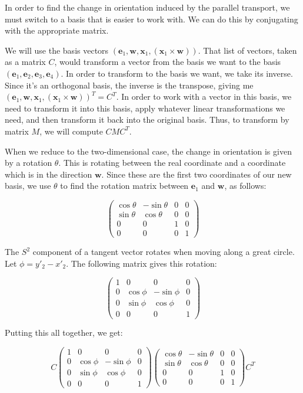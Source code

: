 In order to find the change in orientation induced by the parallel transport, we must switch to a basis that is easier to work with. We can do this by conjugating with the appropriate matrix.

We will use the basis vectors $(\textbf{e}_1, \textbf{w}, \textbf{x}_1, (\textbf{x}_1 \times \textbf{w}))$. That list of vectors, taken as a matrix $C$, would transform a vector from the basis we want to the basis $(\textbf{e}_1,\textbf{e}_2,\textbf{e}_3,\textbf{e}_4)$. In order to transform to the basis we want, we take its inverse. Since it's an orthogonal basis, the inverse is the transpose, giving me $(\textbf{e}_1, \textbf{w},\textbf{x}_1,(\textbf{x}_1 \times \textbf{w}))^T = C^T$. In order to work with a vector in this basis, we need to transform it into this basis, apply whatever linear transformations we need, and then transform it back into the original basis. Thus, to transform by matrix $M$, we will compute $CMC^T$.

When we reduce to the two-dimensional case, the change in orientation is given by a rotation $\theta$. This is rotating between the real coordinate and a coordinate which is in the direction $\textbf{w}$. Since these are the first two coordinates of our new basis, we use $\theta$ to find the rotation matrix between $\textbf{e}_1$ and $\textbf{w}$, as follows:


$$\left(\begin{array}{cccc} \cos\theta & -\sin\theta & 0 & 0 \\ \sin\theta & \cos\theta & 0 & 0 \\ 0 & 0 & 1 & 0 \\ 0 & 0 & 0 & 1 \end{array} \right)$$

The $S^2$ component of a tangent vector rotates when moving along a great circle. Let $\phi = y'_2-x'_2$. The following matrix gives this rotation:

$$\left(\begin{array}{cccc} 1 & 0 & 0 & 0 \\ 0 & \cos\phi & -\sin\phi & 0 \\ 0 & \sin\phi & \cos\phi & 0 \\ 0 & 0 & 0 & 1 \end{array} \right)$$

Putting this all together, we get:

$$C
\left(\begin{array}{cccc} 1 & 0 & 0 & 0 \\ 0 & \cos\phi & -\sin\phi & 0 \\ 0 & \sin\phi & \cos\phi & 0 \\ 0 & 0 & 0 & 1 \end{array} \right)
\left(\begin{array}{cccc} \cos\theta & -\sin\theta & 0 & 0 \\ \sin\theta & \cos\theta & 0 & 0 \\ 0 & 0 & 1 & 0 \\ 0 & 0 & 0 & 1 \end{array} \right)
C^T$$

